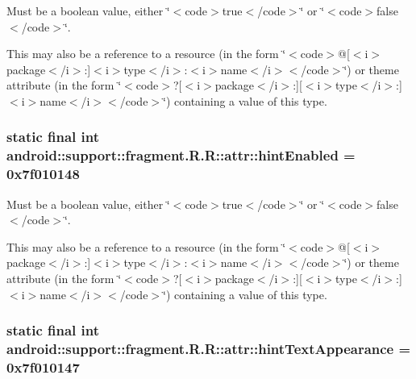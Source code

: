 Must be a boolean value, either \char`\"{}$<$code$>$true$<$/code$>$\char`\"{} or \char`\"{}$<$code$>$false$<$/code$>$\char`\"{}. 

This may also be a reference to a resource (in the form \char`\"{}$<$code$>$@\mbox{[}$<$i$>$package$<$/i$>$:\mbox{]}$<$i$>$type$<$/i$>$:$<$i$>$name$<$/i$>$$<$/code$>$\char`\"{}) or theme attribute (in the form \char`\"{}$<$code$>$?\mbox{[}$<$i$>$package$<$/i$>$:\mbox{]}\mbox{[}$<$i$>$type$<$/i$>$:\mbox{]}$<$i$>$name$<$/i$>$$<$/code$>$\char`\"{}) containing a value of this type. \hypertarget{classandroid_1_1support_1_1fragment_1_1_r_1_1attr_1222d5f4fcdd95a2c7ec8714573ed785}{
\subsubsection[{hintEnabled}]{\setlength{\rightskip}{0pt plus 5cm}static final int android::support::fragment.R.R::attr::hintEnabled = 0x7f010148}}
\label{classandroid_1_1support_1_1fragment_1_1_r_1_1attr_1222d5f4fcdd95a2c7ec8714573ed785}


Must be a boolean value, either \char`\"{}$<$code$>$true$<$/code$>$\char`\"{} or \char`\"{}$<$code$>$false$<$/code$>$\char`\"{}. 

This may also be a reference to a resource (in the form \char`\"{}$<$code$>$@\mbox{[}$<$i$>$package$<$/i$>$:\mbox{]}$<$i$>$type$<$/i$>$:$<$i$>$name$<$/i$>$$<$/code$>$\char`\"{}) or theme attribute (in the form \char`\"{}$<$code$>$?\mbox{[}$<$i$>$package$<$/i$>$:\mbox{]}\mbox{[}$<$i$>$type$<$/i$>$:\mbox{]}$<$i$>$name$<$/i$>$$<$/code$>$\char`\"{}) containing a value of this type. \hypertarget{classandroid_1_1support_1_1fragment_1_1_r_1_1attr_8c3ca7946a54d579d58c37a4b342973a}{
\subsubsection[{hintTextAppearance}]{\setlength{\rightskip}{0pt plus 5cm}static final int android::support::fragment.R.R::attr::hintTextAppearance = 0x7f010147}}
\label{classandroid_1_1support_1_1fragment_1_1_r_1_1attr_8c3ca7946a54d579d58c37a4b342973a}


